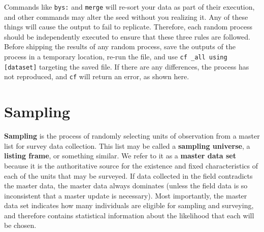 
{
}

Commands like \texttt{bys:} and \texttt{merge} will re-sort your data as part of their execution,
and other commands may alter the seed without you realizing it.
Any of these things will cause the output to fail to replicate.
Therefore, each random process should be independently executed
to ensure that these three rules are followed.
Before shipping the results of any random process,
save the outputs of the process in a temporary location,
re-run the file, and use \texttt{cf \_all using [dataset]} targeting the saved file.
If there are any differences, the process has not reproduced,
and \texttt{cf} will return an error, as shown here.

{
}

\section{Sampling}

\textbf{Sampling} is the process of randomly selecting units of observation
from a master list for survey data collection.
This list may be called a \textbf{sampling universe}, a \textbf{listing frame}, or something similar.
We refer to it as a \textbf{master data set}
because it is the authoritative source
for the existence and fixed characteristics of each of the units that may be surveyed.
If data collected in the field contradicts the master data,
the master data always dominates
(unless the field data is so inconsistent that a master update is necessary).
Most importantly, the master data set indicates
how many individuals are eligible for sampling and surveying,
and therefore contains statistical information
about the likelihood that each will be chosen.


